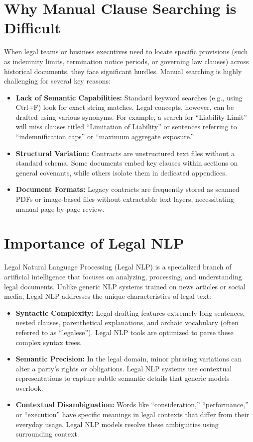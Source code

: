 \documentclass[12pt, a4paper]{report}
\begin{document}
\section{Why Manual Clause Searching is Difficult}
When legal teams or business executives need to locate specific provisions (such as indemnity limits, termination notice periods, or governing law clauses) across historical documents, they face significant hurdles. Manual searching is highly challenging for several key reasons:
\begin{itemize}
    \item \textbf{Lack of Semantic Capabilities:} Standard keyword searches (e.g., using Ctrl+F) look for exact string matches. Legal concepts, however, can be drafted using various synonyms. For example, a search for ``Liability Limit'' will miss clauses titled ``Limitation of Liability'' or sentences referring to ``indemnification caps'' or ``maximum aggregate exposure.''
    \item \textbf{Structural Variation:} Contracts are unstructured text files without a standard schema. Some documents embed key clauses within sections on general covenants, while others isolate them in dedicated appendices.
    \item \textbf{Document Formats:} Legacy contracts are frequently stored as scanned PDFs or image-based files without extractable text layers, necessitating manual page-by-page review.
\end{itemize}

\section{Importance of Legal NLP}
Legal Natural Language Processing (Legal NLP) is a specialized branch of artificial intelligence that focuses on analyzing, processing, and understanding legal documents. Unlike generic NLP systems trained on news articles or social media, Legal NLP addresses the unique characteristics of legal text:
\begin{itemize}
    \item \textbf{Syntactic Complexity:} Legal drafting features extremely long sentences, nested clauses, parenthetical explanations, and archaic vocabulary (often referred to as ``legalese''). Legal NLP tools are optimized to parse these complex syntax trees.
    \item \textbf{Semantic Precision:} In the legal domain, minor phrasing variations can alter a party's rights or obligations. Legal NLP systems use contextual representations to capture subtle semantic details that generic models overlook.
    \item \textbf{Contextual Disambiguation:} Words like ``consideration,'' ``performance,'' or ``execution'' have specific meanings in legal contexts that differ from their everyday usage. Legal NLP models resolve these ambiguities using surrounding context.
\end{itemize}
\end{document}
